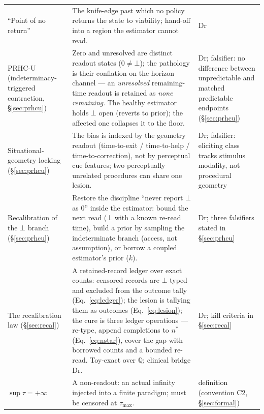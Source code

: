 \documentclass[9pt,twocolumn]{article}
\begin{document}
\begin{table}[!t]
\begin{tabularx}{\textwidth}{p{}X p{}}
``Point of no return'' & The knife-edge past which no policy returns the state to viability; hand-off into a region the estimator cannot read. & Dr \\
PRHC-U (indeterminacy-triggered contraction, \S\ref{sec:prhcu}) & Zero and unresolved are distinct readout states ($0\neq\bot$); the pathology is their conflation on the horizon channel --- an \emph{unresolved} remaining-time readout is retained as \emph{none remaining}. The healthy estimator holds $\bot$ open (reverts to prior); the affected one collapses it to the floor. & Dr; falsifier: no difference between unpredictable and matched predictable endpoints (\S\ref{sec:prhcu}) \\
Situational-geometry locking (\S\ref{sec:prhcu}) & The bias is indexed by the geometry readout (time-to-exit / time-to-help / time-to-correction), not by perceptual cue features; two perceptually unrelated procedures can share one lesion. & Dr; falsifier: eliciting class tracks stimulus modality, not procedural geometry \\
Recalibration of the $\bot$ branch (\S\ref{sec:prhcu}) & Restore the discipline ``never report $\bot$ as $0$'' inside the estimator: bound the next read ($\bot$ with a known re-read time), build a prior by sampling the indeterminate branch (access, not assumption), or borrow a coupled estimator's prior ($k$). & Dr; three falsifiers stated in \S\ref{sec:prhcu} \\
The recalibration law (\S\ref{sec:recal}) & A retained-record ledger over exact counts: censored records are $\bot$-typed and excluded from the outcome tally (Eq.~\ref{eq:ledger}); the lesion is tallying them as outcomes (Eq.~\ref{eq:lesion}); the cure is three ledger operations --- re-type, append completions to $n^{*}$ (Eq.~\ref{eq:nstar}), cover the gap with borrowed counts and a bounded re-read. Toy-exact over $\mathbb Q$; clinical bridge Dr. & Dr; kill criteria in \S\ref{sec:recal} \\
$\sup\tau=+\infty$ & A non-readout: an actual infinity injected into a finite paradigm; must be censored at $\tau_{\max}$. & definition (convention C2, \S\ref{sec:formal}) \\
\bottomrule
\end{tabularx}
\end{table}
\end{document}
